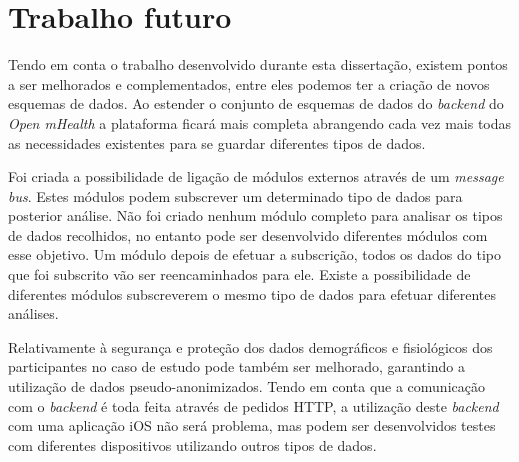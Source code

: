 \section{Trabalho futuro}
Tendo em conta o trabalho desenvolvido durante esta dissertação, existem pontos a ser melhorados e complementados, entre eles podemos ter a criação de novos esquemas de dados. Ao estender o conjunto de esquemas de dados do \textit{backend} do \textit{Open mHealth} a plataforma ficará mais completa abrangendo cada vez mais todas as necessidades existentes para se guardar diferentes tipos de dados.\par
Foi criada a possibilidade de ligação de módulos externos através de um \textit{message bus}. Estes módulos podem subscrever um determinado tipo de dados para posterior análise. Não foi criado nenhum módulo completo para analisar os tipos de dados recolhidos, no entanto pode ser desenvolvido diferentes módulos com esse objetivo. Um módulo depois de efetuar a subscrição, todos os dados do tipo que foi subscrito vão ser reencaminhados para ele. Existe a possibilidade de diferentes módulos subscreverem o mesmo tipo de dados para efetuar diferentes análises.\par
Relativamente à segurança e proteção dos dados demográficos e fisiológicos dos participantes no caso de estudo pode também ser melhorado, garantindo a utilização de dados pseudo-anonimizados.
Tendo em conta que a comunicação com o \textit{backend} é toda feita através de pedidos \gls{HTTP}, a utilização deste \textit{backend} com uma aplicação iOS não será problema, mas podem ser desenvolvidos testes com diferentes dispositivos utilizando outros tipos de dados.

\cleardoublepage